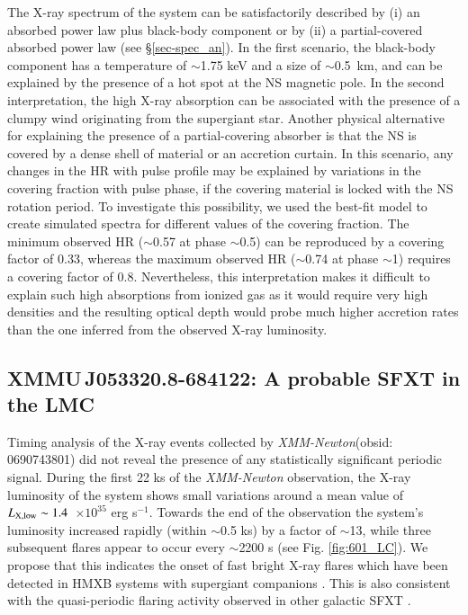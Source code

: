 \documentclass[a4paper,fleqn,usenatbib]{mnras}
\newcommand{\ergs}[1]{$\times 10^{#1}$ erg s$^{-1}$}
\newcommand{\xmm}{{\it XMM-Newton}\xspace}
\newcommand{\candb}{XMMU\,J053320.8-684122\xspace} %
\begin{document}
The X-ray spectrum of the system can be satisfactorily described by (i) an absorbed power law plus black-body component or by (ii) a partial-covered absorbed power law (see \S\ref{sec-spec_an}). In the first scenario,  the black-body component has a temperature of $\sim$1.75 keV and a size of $\sim$0.5~km, and can be explained by the presence of a hot spot at the NS magnetic pole. 
In the second interpretation, the high X-ray absorption can be associated with the presence of a clumpy wind originating from the supergiant star. Another physical alternative for explaining the presence of a partial-covering absorber is that the NS is covered by a dense shell of material or an accretion curtain. In this scenario, any changes in the HR with pulse profile may be explained by variations in the covering fraction with pulse phase, if the covering material is locked with the NS rotation period. To investigate this possibility, we 
used the best-fit model to create simulated spectra for different values of the covering fraction. The minimum observed HR ($\sim$0.57 at phase $\sim$0.5) can be reproduced by a covering factor of 0.33, whereas the maximum observed HR ($\sim$0.74 at phase $\sim$1) requires a covering factor of 0.8. Nevertheless, this interpretation makes it difficult to explain such high absorptions from ionized gas as it would require very high densities and the resulting optical depth would probe much higher accretion rates than the one inferred from the observed X-ray luminosity.    

\subsection{\candb: A probable SFXT in the LMC}

Timing analysis of the X-ray events collected by \xmm (obsid: 0690743801)  did not reveal the presence of any statistically significant periodic signal. 
During the first 22 ks of the \xmm observation, the X-ray luminosity of the system shows small variations around a mean value of $L_{\rm X,low} \sim1.4$~\ergs{35}. Towards the end of the observation the system's luminosity increased rapidly (within $\sim$0.5 ks) by a factor of $\sim$13, while three subsequent flares appear to occur every $\sim$2200 s (see Fig. \ref{fig:601_LC}). 
We propose that this indicates the onset of fast bright X-ray flares which have been detected in HMXB systems with supergiant companions \citep{2006ESASP.604..165N}. 
This is also consistent with the quasi-periodic flaring activity observed in other galactic SFXT \citep[e.g. IGR J11215-5952 \& IGR J16418-4532:][]{2017ApJ...838..133S,2012MNRAS.420..554S}. 
\end{document}
